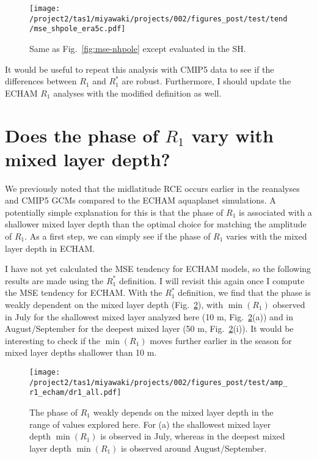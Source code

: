 \documentclass{article}
\begin{document}
\begin{figure}
    \texttt{[image: /project2/tas1/miyawaki/projects/002/figures\_post/test/tend/mse\_shpole\_era5c.pdf]}
    \caption{Same as Fig.~\ref{fig:mse-nhpole} except evaluated in the SH.}
    \label{fig:mse-shpole}
\end{figure}

It would be useful to repeat this analysis with CMIP5 data to see if the differences between $R_1$ and $R_1^*$ are robust. Furthermore, I should update the ECHAM $R_1$ analyses with the modified definition as well.

\section{Does the phase of $R_1$ vary with mixed layer depth?}
We previously noted that the midlatitude RCE occurs earlier in the reanalyses and CMIP5 GCMs compared to the ECHAM aquaplanet simulations. A potentially simple explanation for this is that the phase of $R_1$ is associated with a shallower mixed layer depth than the optimal choice for matching the amplitude of $R_1$. As a first step, we can simply see if the phase of $R_1$ varies with the mixed layer depth in ECHAM.

I have not yet calculated the MSE tendency for ECHAM models, so the following results are made using the $R_1^*$ definition. I will revisit this again once I compute the MSE tendency for ECHAM. With the $R_1^*$ definition, we find that the phase is weakly dependent on the mixed layer depth (Fig.~\ref{fig:dr1-all}), with $\min(R_1)$ observed in July for the shallowest mixed layer analyzed here (10 m, Fig.~\ref{fig:dr1-all}(a)) and in August/September for the deepest mixed layer (50 m, Fig.~\ref{fig:dr1-all}(i)). It would be interesting to check if the $\min(R_1)$ moves further earlier in the season for mixed layer depths shallower than 10 m.

\begin{figure}
    \texttt{[image: /project2/tas1/miyawaki/projects/002/figures\_post/test/amp\_r1\_echam/dr1\_all.pdf]}
    \caption{The phase of $R_1$ weakly depends on the mixed layer depth in the range of values explored here. For (a) the shallowest mixed layer depth $\min(R_1)$ is observed in July, whereas in the deepest mixed layer depth $\min(R_1)$ is observed around August/September.}
    \label{fig:dr1-all}
\end{figure}




\end{document}
